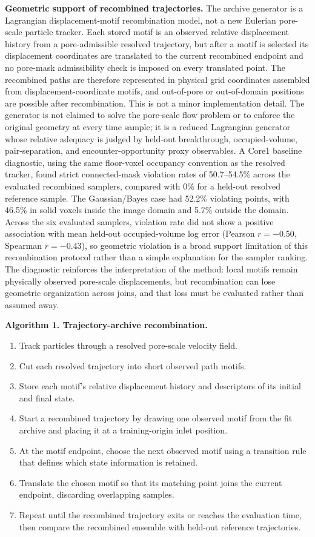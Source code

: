 \documentclass[11pt]{article}
\newcommand{\gb}{Gaussian/Bayes}
\begin{document}
\noindent\textbf{Geometric support of recombined trajectories.}
The archive generator is a Lagrangian displacement-motif recombination model, not a new Eulerian pore-scale particle tracker. Each stored motif is an observed relative displacement history from a pore-admissible resolved trajectory, but after a motif is selected its displacement coordinates are translated to the current recombined endpoint and no pore-mask admissibility check is imposed on every translated point. The recombined paths are therefore represented in physical grid coordinates assembled from displacement-coordinate motifs, and out-of-pore or out-of-domain positions are possible after recombination. This is not a minor implementation detail. The generator is not claimed to solve the pore-scale flow problem or to enforce the original geometry at every time sample; it is a reduced Lagrangian generator whose relative adequacy is judged by held-out breakthrough, occupied-volume, pair-separation, and encounter-opportunity proxy observables. A Core1 baseline diagnostic, using the same floor-voxel occupancy convention as the resolved tracker, found strict connected-mask violation rates of 50.7--54.5\% across the evaluated recombined samplers, compared with 0\% for a held-out resolved reference sample. The \gb{} case had 52.2\% violating points, with 46.5\% in solid voxels inside the image domain and 5.7\% outside the domain. Across the six evaluated samplers, violation rate did not show a positive association with mean held-out occupied-volume log error (Pearson $r=-0.50$, Spearman $r=-0.43$), so geometric violation is a broad support limitation of this recombination protocol rather than a simple explanation for the sampler ranking. The diagnostic reinforces the interpretation of the method: local motifs remain physically observed pore-scale displacements, but recombination can lose geometric organization across joins, and that loss must be evaluated rather than assumed away.

\noindent\textbf{Algorithm 1. Trajectory-archive recombination.}
\begin{enumerate}
  \item Track particles through a resolved pore-scale velocity field.
  \item Cut each resolved trajectory into short observed path motifs.
  \item Store each motif's relative displacement history and descriptors of its initial and final state.
  \item Start a recombined trajectory by drawing one observed motif from the fit archive and placing it at a training-origin inlet position.
  \item At the motif endpoint, choose the next observed motif using a transition rule that defines which state information is retained.
  \item Translate the chosen motif so that its matching point joins the current endpoint, discarding overlapping samples.
  \item Repeat until the recombined trajectory exits or reaches the evaluation time, then compare the recombined ensemble with held-out reference trajectories.
\end{enumerate}
\end{document}
